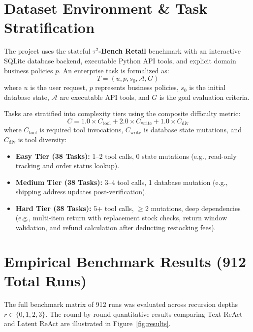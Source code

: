 \documentclass[11pt,a4paper]{article}
\begin{document}
\newpage
\section{Dataset Environment \& Task Stratification}
The project uses the stateful \textbf{$\tau^2$-Bench Retail} benchmark with an interactive SQLite database backend, executable Python API tools, and explicit domain business policies $p$. An enterprise task is formalized as:
\begin{equation}
    T = (u, p, s_0, \mathcal{A}, G)
\end{equation}
where $u$ is the user request, $p$ represents business policies, $s_0$ is the initial database state, $\mathcal{A}$ are executable API tools, and $G$ is the goal evaluation criteria.

Tasks are stratified into complexity tiers using the composite difficulty metric:
\begin{equation}
    C = 1.0 \times C_{\text{tool}} + 2.0 \times C_{\text{write}} + 1.0 \times C_{\text{div}}
\end{equation}
where $C_{\text{tool}}$ is required tool invocations, $C_{\text{write}}$ is database state mutations, and $C_{\text{div}}$ is tool diversity:
\begin{itemize}
    \item \textbf{Easy Tier (38 Tasks):} 1--2 tool calls, 0 state mutations (e.g., read-only tracking and order status lookup).
    \item \textbf{Medium Tier (38 Tasks):} 3--4 tool calls, 1 database mutation (e.g., shipping address updates post-verification).
    \item \textbf{Hard Tier (38 Tasks):} 5+ tool calls, $\ge 2$ mutations, deep dependencies (e.g., multi-item return with replacement stock checks, return window validation, and refund calculation after deducting restocking fees).
\end{itemize}

\section{Empirical Benchmark Results (912 Total Runs)}
The full benchmark matrix of 912 runs was evaluated across recursion depths $r \in \{0, 1, 2, 3\}$. The round-by-round quantitative results comparing Text ReAct and Latent ReAct are illustrated in Figure~\ref{fig:results}.
\end{document}
